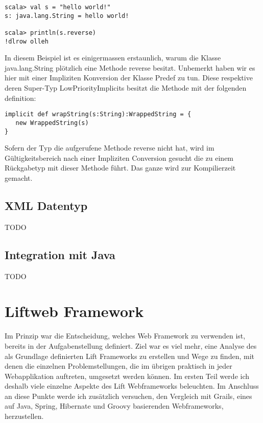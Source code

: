 \begin{lstlisting}[caption=Implicit Conversions am Beispiel String]
scala> val s = "hello world!"
s: java.lang.String = hello world!

scala> println(s.reverse)
!dlrow olleh
\end{lstlisting}
In diesem Beispiel ist es einigermassen erstaunlich, warum die Klasse java.lang.String pl\"otzlich eine Methode reverse besitzt. Unbemerkt haben wir es hier mit einer Impliziten Konversion der Klasse Predef zu tun. Diese respektive deren Super-Typ LowPriorityImplicits besitzt die Methode mit der folgenden definition:
\begin{lstlisting}[caption=Implicit Conversions Method wrapString]
implicit def wrapString(s:String):WrappedString = {
   new WrappedString(s)
}
\end{lstlisting}
Sofern der Typ die aufgerufene Methode reverse nicht hat, wird im G\"ultigkeitsbereich nach einer Impliziten Conversion gesucht die zu einem R\"uckgabetyp mit dieser Methode f\"uhrt. Das ganze wird zur Kompilierzeit gemacht.

\subsection{XML Datentyp}\label{grundlagen:scala:xmldatentyp}
TODO

\subsection{Integration mit Java}\label{grundlagen:integration:java}
TODO


\section{Liftweb Framework}\label{einarbeitung:lift}
Im Prinzip war die Entscheidung, welches Web Framework zu verwenden ist, bereits in der Aufgabenstellung definiert. Ziel war es viel mehr, eine Analyse des als Grundlage definierten Lift Frameworks zu erstellen und Wege zu finden, mit denen die einzelnen Problemstellungen, die im \"ubrigen praktisch in jeder Webapplikation auftreten, umgesetzt werden k\"onnen. Im ersten Teil werde ich deshalb viele einzelne Aspekte des Lift Webframeworks beleuchten. Im Anschluss an diese Punkte werde ich zus\"atzlich versuchen, den Vergleich mit Grails, eines auf Java, Spring, Hibernate und Groovy basierenden Webframeworks, herzustellen.

